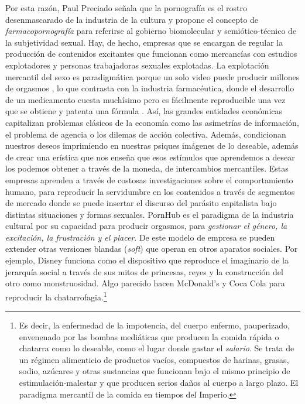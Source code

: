 Por esta razón, Paul Preciado señala que la pornografía es el rostro desenmascarado de la industria de la cultura y propone el concepto de \emph{farmacopornografía} para referirse al gobierno biomolecular y semiótico-técnico de la subjetividad sexual. Hay, de hecho, empresas que se encargan de regular la producción de contenidos excitantes que funcionan como mercancías con estudios explotadores y personas trabajadoras sexuales explotadas. La explotación mercantil del sexo es paradigmática porque un solo video puede producir millones de orgasmos \autocite{StatsArchivesPornhub}, lo que contrasta con la industria farmacéutica, donde el desarrollo de un medicamento cuesta muchísimo pero es fácilmente reproducible una vez que se obtiene y patenta una fórmula \autocite{preciadoTestoYonqui2008}. Así, las grandes entidades económicas capitalizan problemas clásicos de la economía como las asimetrías de información, el problema de agencia o los dilemas de acción colectiva. Además, condicionan nuestros deseos imprimiendo en nuestras psiques imágenes de lo deseable, además de crear una erística que nos enseña que esos estímulos que aprendemos a desear los podemos obtener a través de la moneda, de intercambios mercantiles. Estas empresas aprenden a través de costosas investigaciones sobre el comportamiento humano, para reproducir la servidumbre en los contenidos a través de segmentos de mercado donde se puede insertar el discurso del parásito capitalista bajo distintas situaciones y formas sexuales. PornHub es el paradigma de la industria cultural por su capacidad para producir orgasmos, para \emph{gestionar el género, la excitación, la frustración y el placer}. De este modelo de empresa se pueden extender otras versiones blandas (\emph{soft}) que operan en otros aparatos sociales. Por ejemplo, Disney funciona como el dispositivo que reproduce el imaginario de la jerarquía social a través de sus mitos de princesas, reyes y la construcción del otro como monstruosidad. Algo parecido hacen McDonald's y Coca Cola para reproducir la chatarrofagia.\footnote{Es decir, la enfermedad de la impotencia, del cuerpo enfermo, pauperizado, envenenado por las bombas mediáticas que producen la comida rápida o chatarra como lo deseable, como el lugar donde gastar el \emph{salario}. Se trata de un régimen alimenticio de productos vacíos, compuestos de harinas, grasas, sodio, azúcares y otras sustancias que funcionan bajo el mismo principio de estimulación-malestar y que producen serios daños al cuerpo a largo plazo. El paradigma mercantil de la comida en tiempos del Imperio.}

